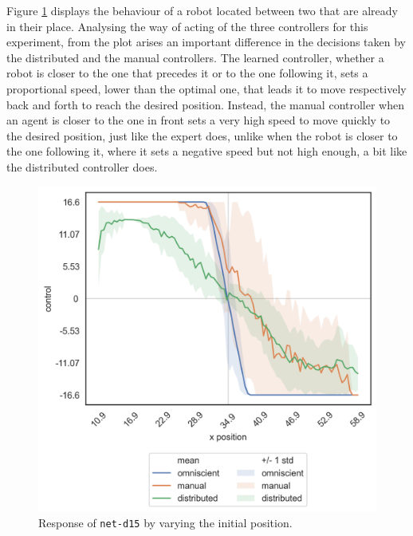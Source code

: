 Figure \ref{fig:net-d15responseposition} displays the behaviour of a robot 
located between two that are already in their place.
Analysing the way of acting of the three controllers for this experiment, from 
the plot arises an important difference in the decisions taken by the distributed 
and the manual controllers.
The learned controller, whether a robot is closer to the one that precedes it 
or to the one following it, sets a proportional speed, lower than the optimal one, 
that leads it to move respectively back and forth to reach the desired position.
Instead, the manual controller when an agent is closer to the one in front 
sets a very high speed to move quickly to the desired position, just like the expert 
does, unlike when the robot is closer to the one following it, where it sets a 
negative speed but not high enough, a bit like the distributed controller does.
\begin{figure}[!htb]
	\centering
	\includegraphics[width=.45\textwidth]{contents/images/net-d15/response-varying_init_position-distributed}%
	\caption{Response of \texttt{net-d15} by varying the initial position.}
	\label{fig:net-d15responseposition}
\end{figure}

